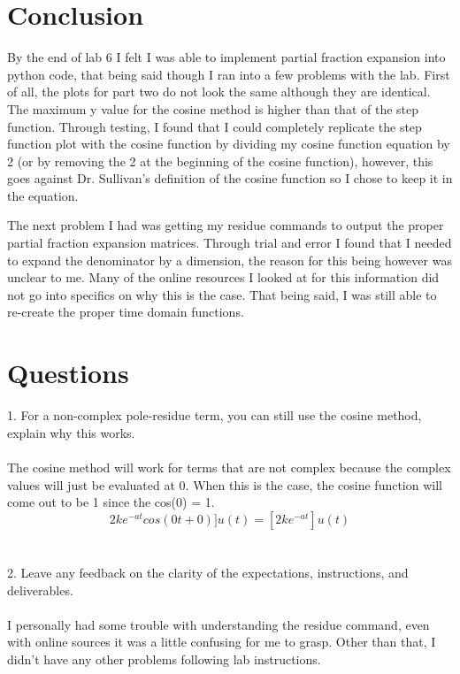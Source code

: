 \documentclass[12pt]{report}
\begin{document}
\section{Conclusion}
\hspace{\parindent}By the end of lab 6 I felt I was able to implement partial fraction expansion into python code, that being said though I ran into a few problems with the lab. First of all, the plots for part two do not look the same although they are identical. The maximum y value for the cosine method is higher than that of the step function. Through testing, I found that I could completely replicate the step function plot with the cosine function by dividing my cosine function equation by 2 (or by removing the 2 at the beginning of the cosine function), however, this goes against Dr. Sullivan's definition of the cosine function so I chose to keep it in the equation.\par
\hspace{\parindent}The next problem I had was getting my residue commands to output the proper partial fraction expansion matrices. Through trial and error I found that I needed to expand the denominator by a dimension, the reason for this being however was unclear to me. Many of the online resources I looked at for this information did not go into specifics on why this is the case. That being said, I was still able to re-create the proper time domain functions.
\section{Questions}
1. For a non-complex pole-residue term, you can still use the cosine method, explain why this works.\\\\
The cosine method will work for terms that are not complex because the complex values will just be evaluated at 0. When this is the case, the cosine function will come out to be 1 since the cos(0) = 1. 
\[2ke^{-at}cos(0t + 0)]u(t) = [2ke^{-at}]u(t)\]
\\\\
2. Leave any feedback on the clarity of the expectations, instructions, and deliverables.
\\\\
I personally had some trouble with understanding the residue command, even with online sources it was a little confusing for me to grasp. Other than that, I didn't have any other problems following lab instructions.  
\end{document}
